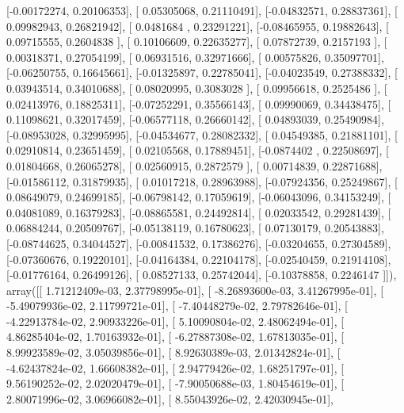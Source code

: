 \documentclass{article}
\begin{document}
       [-0.00172274,  0.20106353],
       [ 0.05305068,  0.21110491],
       [-0.04832571,  0.28837361],
       [ 0.09982943,  0.26821942],
       [ 0.0481684 ,  0.23291221],
       [-0.08465955,  0.19882643],
       [ 0.09715555,  0.2604838 ],
       [ 0.10106609,  0.22635277],
       [ 0.07872739,  0.2157193 ],
       [ 0.00318371,  0.27054199],
       [ 0.06931516,  0.32971666],
       [ 0.00575826,  0.35097701],
       [-0.06250755,  0.16645661],
       [-0.01325897,  0.22785041],
       [-0.04023549,  0.27388332],
       [ 0.03943514,  0.34010688],
       [ 0.08020995,  0.3083028 ],
       [ 0.09956618,  0.2525486 ],
       [ 0.02413976,  0.18825311],
       [-0.07252291,  0.35566143],
       [ 0.09990069,  0.34438475],
       [ 0.11098621,  0.32017459],
       [-0.06577118,  0.26660142],
       [ 0.04893039,  0.25490984],
       [-0.08953028,  0.32995995],
       [-0.04534677,  0.28082332],
       [ 0.04549385,  0.21881101],
       [ 0.02910814,  0.23651459],
       [ 0.02105568,  0.17889451],
       [-0.0874402 ,  0.22508697],
       [ 0.01804668,  0.26065278],
       [ 0.02560915,  0.2872579 ],
       [ 0.00714839,  0.22871688],
       [-0.01586112,  0.31879935],
       [ 0.01017218,  0.28963988],
       [-0.07924356,  0.25249867],
       [ 0.08649079,  0.24699185],
       [-0.06798142,  0.17059619],
       [-0.06043096,  0.34153249],
       [ 0.04081089,  0.16379283],
       [-0.08865581,  0.24492814],
       [ 0.02033542,  0.29281439],
       [ 0.06884244,  0.20509767],
       [-0.05138119,  0.16780623],
       [ 0.07130179,  0.20543883],
       [-0.08744625,  0.34044527],
       [-0.00841532,  0.17386276],
       [-0.03204655,  0.27304589],
       [-0.07360676,  0.19220101],
       [-0.04164384,  0.22104178],
       [-0.02540459,  0.21914108],
       [-0.01776164,  0.26499126],
       [ 0.08527133,  0.25742044],
       [-0.10378858,  0.2246147 ]]), array([[  1.71212409e-03,   2.37798995e-01],
       [ -8.26893600e-03,   3.41267995e-01],
       [ -5.49079936e-02,   2.11799721e-01],
       [ -7.40448279e-02,   2.79782646e-01],
       [ -4.22913784e-02,   2.90933226e-01],
       [  5.10090804e-02,   2.48062494e-01],
       [  4.86285404e-02,   1.70163932e-01],
       [ -6.27887308e-02,   1.67813035e-01],
       [  8.99923589e-02,   3.05039856e-01],
       [  8.92630389e-03,   2.01342824e-01],
       [ -4.62437824e-02,   1.66608382e-01],
       [  2.94779426e-02,   1.68251797e-01],
       [  9.56190252e-02,   2.02020479e-01],
       [ -7.90050688e-03,   1.80454619e-01],
       [  2.80071996e-02,   3.06966082e-01],
       [  8.55043926e-02,   2.42030945e-01],
\end{document}
